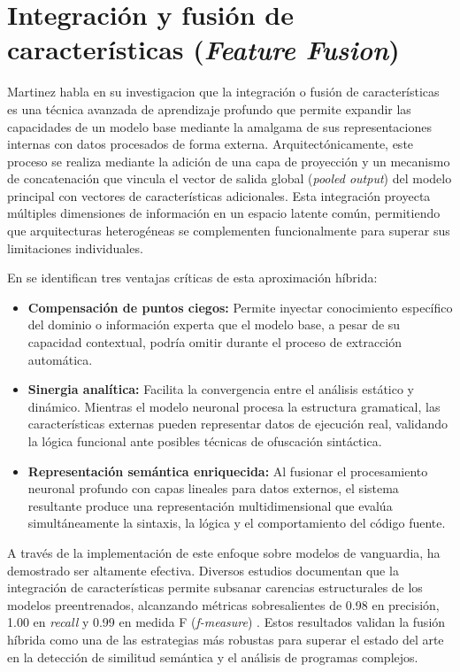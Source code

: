 \section{Integración y fusión de características (\textit{Feature Fusion})}

Martinez habla en su investigacion \cite{MartinezGil2026Improving} que la integración o fusión de características es una técnica avanzada de aprendizaje profundo que permite expandir las capacidades de un modelo base mediante la amalgama de sus representaciones internas con datos procesados de forma externa. Arquitectónicamente, este proceso se realiza mediante la adición de una capa de proyección y un mecanismo de concatenación que vincula el vector de salida global (\textit{pooled output}) del modelo principal con vectores de características adicionales. Esta integración proyecta múltiples dimensiones de información en un espacio latente común, permitiendo que arquitecturas heterogéneas se complementen funcionalmente para superar sus limitaciones individuales.

En \cite{MartinezGil2026Improving} se identifican tres ventajas críticas de esta aproximación híbrida:

\begin{itemize}
\item \textbf{Compensación de puntos ciegos:} Permite inyectar conocimiento específico del dominio o información experta que el modelo base, a pesar de su capacidad contextual, podría omitir durante el proceso de extracción automática.
\item \textbf{Sinergia analítica:} Facilita la convergencia entre el análisis estático y dinámico. Mientras el modelo neuronal procesa la estructura gramatical, las características externas pueden representar datos de ejecución real, validando la lógica funcional ante posibles técnicas de ofuscación sintáctica.
\item \textbf{Representación semántica enriquecida:} Al fusionar el procesamiento neuronal profundo con capas lineales para datos externos, el sistema resultante produce una representación multidimensional que evalúa simultáneamente la sintaxis, la lógica y el comportamiento del código fuente.
\end{itemize}

A través de la implementación de este enfoque sobre modelos de vanguardia, ha demostrado ser altamente efectiva. Diversos estudios documentan que la integración de características permite subsanar carencias estructurales de los modelos preentrenados, alcanzando métricas sobresalientes de 0.98 en precisión, 1.00 en \textit{recall} y 0.99 en medida F (\textit{f-measure}) \cite{MartinezGil2026Improving}. Estos resultados validan la fusión híbrida como una de las estrategias más robustas para superar el estado del arte en la detección de similitud semántica y el análisis de programas complejos.

